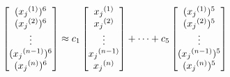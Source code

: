 \documentclass[preview]{standalone}
\begin{document}
\begin{align*}
\special{dvisvgm:raw <g id='unique000'>}\begin{bmatrix}({x_j}^{(1)})^6\\({x_j}^{(2)})^6\\\vdots\\({x_j}^{(n-1)})^6\\({x_j}^{(n)})^6\end{bmatrix}\approx c_1\begin{bmatrix}{x_j}^{(1)}\\{x_j}^{(2)}\\\vdots\\{x_j}^{(n-1)}\\{x_j}^{(n)}\end{bmatrix}+\cdots+c_5\begin{bmatrix}({x_j}^{(1)})^5\\({x_j}^{(2)})^5\\\vdots\\({x_j}^{(n-1)})^5\\({x_j}^{(n)})^5\end{bmatrix}\special{dvisvgm:raw </g>}
\end{align*}
\end{document}
